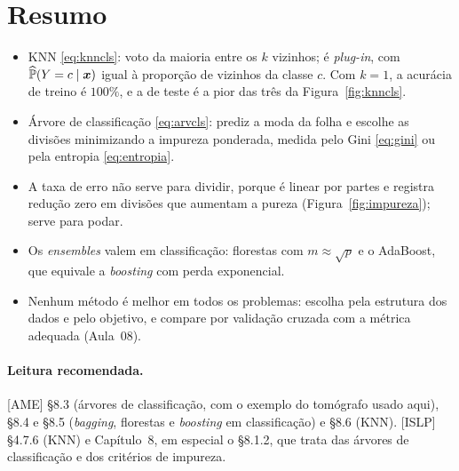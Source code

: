 \documentclass[11pt,a4paper]{article}
\begin{document}
\section*{Resumo}
\begin{itemize}[leftmargin=1.4cm]
  \item KNN \eqref{eq:knncls}: voto da maioria entre os $k$ vizinhos; é
        \emph{plug-in}, com $\widehat{\mathbb{P}}(Y=c\mid\bm{x})$ igual à proporção de vizinhos
        da classe $c$. Com $k=1$, a acurácia de treino é $100\%$, e a de teste é a
        pior das três da Figura~\ref{fig:knncls}.
  \item Árvore de classificação \eqref{eq:arvcls}: prediz a moda da folha e escolhe
        as divisões minimizando a impureza ponderada, medida pelo Gini
        \eqref{eq:gini} ou pela entropia \eqref{eq:entropia}.
  \item A taxa de erro não serve para dividir, porque é linear por partes e registra
        redução zero em divisões que aumentam a pureza
        (Figura~\ref{fig:impureza}); serve para podar.
  \item Os \emph{ensembles} valem em classificação: florestas com $m\approx\sqrt p$ e
        o AdaBoost, que equivale a \emph{boosting} com perda exponencial.
  \item Nenhum método é melhor em todos os problemas: escolha pela estrutura dos dados
        e pelo objetivo, e compare por validação cruzada com a métrica adequada
        (Aula~08).
\end{itemize}

\paragraph{Leitura recomendada.} [AME] §8.3 (árvores de classificação, com o exemplo
do tomógrafo usado aqui), §8.4 e §8.5 (\emph{bagging}, florestas e \emph{boosting} em
classificação) e §8.6 (KNN). [ISLP] §4.7.6 (KNN) e Capítulo~8, em especial o §8.1.2,
que trata das árvores de classificação e dos critérios de impureza.
\end{document}
